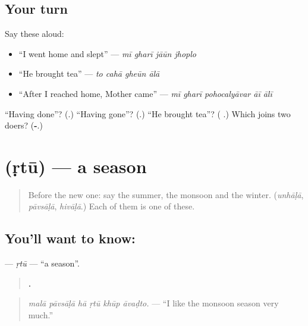 \subsection*{Your turn}
Say these aloud:

\begin{itemize}
\raggedright
  \item \textquotedblleft{}I went home and slept\textquotedblright{} — \emph{mī gharī jāūn jhoplo}
  \item \textquotedblleft{}He brought tea\textquotedblright{} — \emph{to cahā gheūn ālā}
  \item \textquotedblleft{}After I reached home, Mother came\textquotedblright{} — \emph{mī gharī pohocalyāvar āī ālī}
\end{itemize}

\begin{tcolorbox}[breakable,colback=teal!4,colframe=teal!35!black,title={Before you move on}]
\textquotedblleft{}Having done\textquotedblright{}? (\textbf{}.) \textquotedblleft{}Having gone\textquotedblright{}? (\textbf{}.) \textquotedblleft{}He brought tea\textquotedblright{}? (\textbf{   }.) Which joins two doers? (\textbf{-}.)
\end{tcolorbox}
\section[\texorpdfstring{\mr{ऋतू} (ṛtū)}{ऋतू (ṛtū)}]{ (ṛtū) — a season}

\label{lesson:MR-C279-rtu}



\begin{quote}
Before the new one: say the summer, the monsoon and the winter. (\emph{unhāḷā}, \emph{pāvsāḷā}, \emph{hivāḷā}.) Each of them is one of these.
\end{quote}

\subsection*{You'll want to know: }
\textbf{} — \emph{ṛtū} — \textquotedblleft{}a season\textquotedblright{}.

\begin{quote}
\textbf{     .}
\end{quote}

\begin{quote}
\emph{malā pāvsāḷā hā ṛtū khūp āvaḍto.} — \textquotedblleft{}I like the monsoon season very much.\textquotedblright{}
\end{quote}

